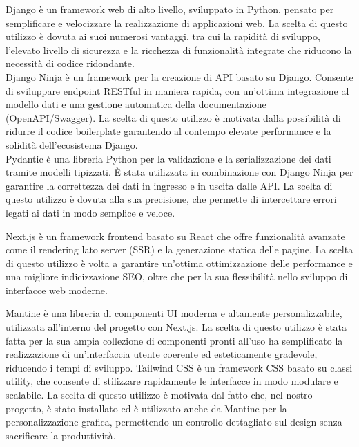 \documentclass[a4paper]{report}
\begin{document}
\clearpage
{}


Django è un framework web di alto livello, sviluppato in Python, pensato per semplificare e velocizzare la realizzazione di applicazioni web. La scelta di questo utilizzo è dovuta ai suoi numerosi vantaggi, tra cui la rapidità di sviluppo, l’elevato livello di sicurezza e la ricchezza di funzionalità integrate che riducono la necessità di codice ridondante.\\

Django Ninja è un framework per la creazione di API basato su Django. Consente di sviluppare endpoint RESTful in maniera rapida, con un’ottima integrazione al modello dati e una gestione automatica della documentazione (OpenAPI/Swagger). La scelta di questo utilizzo è motivata dalla possibilità di ridurre il codice boilerplate garantendo al contempo elevate performance e la solidità dell’ecosistema Django.\\

Pydantic è una libreria Python per la validazione e la serializzazione dei dati tramite modelli tipizzati. È stata utilizzata in combinazione con Django Ninja per garantire la correttezza dei dati in ingresso e in uscita dalle API. La scelta di questo utilizzo è dovuta alla sua precisione, che permette di intercettare errori legati ai dati in modo semplice e veloce.


Next.js è un framework frontend basato su React che offre funzionalità avanzate come il rendering lato server (SSR) e la generazione statica delle pagine. La scelta di questo utilizzo è volta a garantire un’ottima ottimizzazione delle performance e una migliore indicizzazione SEO, oltre che per la sua flessibilità nello sviluppo di interfacce web moderne.

Mantine è una libreria di componenti UI moderna e altamente personalizzabile, utilizzata all’interno del progetto con Next.js. La scelta di questo utilizzo è stata fatta per la sua ampia collezione di componenti pronti all’uso ha semplificato la realizzazione di un’interfaccia utente coerente ed esteticamente gradevole, riducendo i tempi di sviluppo.
Tailwind CSS è un framework CSS basato su classi utility, che consente di stilizzare rapidamente le interfacce in modo modulare e scalabile. La scelta di questo utilizzo è motivata dal fatto che, nel nostro progetto, è stato installato ed è utilizzato anche da Mantine per la personalizzazione grafica, permettendo un controllo dettagliato sul design senza sacrificare la produttività.
\end{document}
